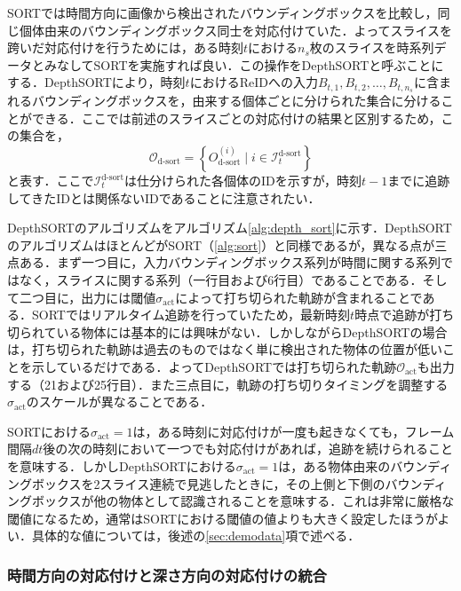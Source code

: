         SORTでは時間方向に画像から検出されたバウンディングボックスを比較し，同じ個体由来のバウンディングボックス同士を対応付けていた．よってスライスを跨いだ対応付けを行うためには，ある時刻$t$における$n_s$枚のスライスを時系列データとみなしてSORTを実施すれば良い．この操作をDepthSORTと呼ぶことにする．DepthSORTにより，時刻$t$におけるReIDへの入力$B_{t, 1}, B_{t,2}, \dots, B_{t, n_s}$に含まれるバウンディングボックスを，由来する個体ごとに分けられた集合に分けることができる．ここでは前述のスライスごとの対応付けの結果と区別するため，この集合を，
        \begin{equation}
            \label{eq:dsort_identified_bboxes}
            \mathcal{O}_{\text{d-sort}} = \left\{O_{\text{d-sort}}^{(i)} \mid i \in \mathcal{I}_{t}^{\text{d-sort}}\right\}
        \end{equation}
        と表す．ここで$\mathcal{I}_t^{\text{d-sort}}$は仕分けられた各個体のIDを示すが，時刻$t-1$までに追跡してきたIDとは関係ないIDであることに注意されたい．

        DepthSORTのアルゴリズムをアルゴリズム\ref{alg:depth_sort}に示す．DepthSORTのアルゴリズムはほとんどがSORT（\ref{alg:sort}）と同様であるが，異なる点が三点ある．まず一つ目に，入力バウンディングボックス系列が時間に関する系列ではなく，スライスに関する系列（一行目および6行目）であることである．そして二つ目に，出力には閾値$\sigma_{\text{act}}$によって打ち切られた軌跡が含まれることである．SORTではリアルタイム追跡を行っていたため，最新時刻$t$時点で追跡が打ち切られている物体には基本的には興味がない．しかしながらDepthSORTの場合は，打ち切られた軌跡は過去のものではなく単に検出された物体の位置が低いことを示しているだけである．よってDepthSORTでは打ち切られた軌跡$\mathcal{O}_{\text{act}}$も出力する（21および25行目）．また三点目に，軌跡の打ち切りタイミングを調整する$\sigma_{\text{act}}$のスケールが異なることである．

        SORTにおける$\sigma_{\text{act}} = 1$は，ある時刻に対応付けが一度も起きなくても，フレーム間隔$dt$後の次の時刻において一つでも対応付けがあれば，追跡を続けられることを意味する．しかしDepthSORTにおける$\sigma_{\text{act}} = 1$は，ある物体由来のバウンディングボックスを2スライス連続で見逃したときに，その上側と下側のバウンディングボックスが他の物体として認識されることを意味する．これは非常に厳格な閾値になるため，通常はSORTにおける閾値の値よりも大きく設定したほうがよい．具体的な値については，後述の\ref{sec:demodata}項で述べる．
        
        \subsubsection{時間方向の対応付けと深さ方向の対応付けの統合}

